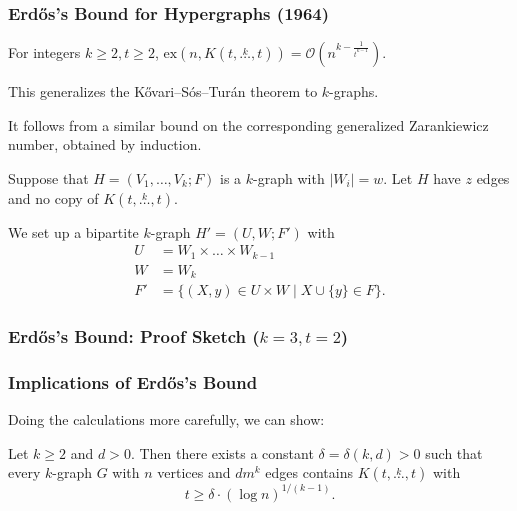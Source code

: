 \documentclass[aspectratio=169]{beamer}
\newcommand{\ex}[2]{\ensuremath{\text{ex} \left( #1, #2 \right)}}
\newcommand{\compoverset}[2]{\ensuremath{K\left(#2, \overset{#1}{\dots}, #2\right)}} %
\newcommand{\bigO}[1]{\ensuremath{\mathcal{O}\left(#1\right)}}
\theoremstyle{mystyle}
\begin{document}
\begin{frame}
    \frametitle{Erd\H{o}s's Bound for Hypergraphs (1964)}

    \begin{theorem}[Erd\H{o}s '64]
        For integers $k \ge 2, t \ge 2$,
        $\ex{n}{\compoverset{k}{t}} = \bigO{n^{k - \frac{1}{t^{k-1}}}}.$
    \end{theorem}

    This generalizes the Kővari--Sós--Turán theorem to $k$-graphs.

    It follows from a similar bound on the corresponding generalized Zarankiewicz number,
    obtained by induction.

    Suppose that $H = (V_1, \dots, V_k; F)$ is a $k$-graph with $|W_i| = w$.
    Let $H$ have $z$ edges and no copy of $\compoverset{k}{t}$.

    We set up a bipartite $k$-graph $H' = (U, W; F')$ with
    \begin{align*}
        U &=  W_1 \times \dots \times W_{k-1} \\
        W &= W_k \\
        F' &= \{(X, y) \in U \times W \mid X \cup \{y\} \in F\}.
    \end{align*}

\end{frame}

\begin{frame}[fragile]
    \frametitle{Erd\H{o}s's Bound: Proof Sketch ($k=3, t=2$)}

    \begin{adjustwidth}{-0.5cm}{0cm} %

        \begin{figure}
            \centering
            \scalebox{0.6}{
                
            }
        \end{figure}

    \end{adjustwidth}

\end{frame}

\begin{frame}
    \frametitle{Implications of Erdős's Bound}
    Doing the calculations more carefully, we can show:
    \begin{theorem}
        Let $k \geq 2$ and $d > 0$.
        Then there exists a constant $\delta = \delta(k, d) > 0$ such that
        every $k$-graph $G$ with $n$ vertices and $dm^k$ edges
        contains $\compoverset{k}{t}$ with
        \[
            t \geq \delta \cdot (\log n)^{1/(k-1)}.
        \]
    \end{theorem}


\end{frame}
\end{document}
